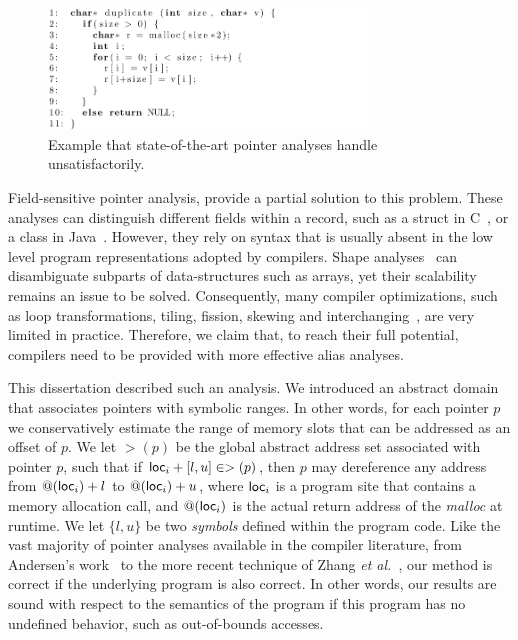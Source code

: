 \documentclass[12pt]{article}
\newcommand\loc[1]{\mbox{\textsf{loc}$_{#1}$}}
\begin{document}
\begin{figure}[th]
  \centering
\includegraphics[width=320px]{img/introex}
  \caption{Example that state-of-the-art pointer analyses handle 
  unsatisfactorily.}
  \label{fig:intro_ex}
\end{figure}

Field-sensitive pointer analysis, provide a partial solution to this problem.
These analyses can distinguish different fields within a record, such
as a struct in C~\cite{Pearce04}, or a class in Java~\cite{Yan11}.
However, they rely on syntax that is usually absent in the low level program
representations adopted by compilers.
Shape analyses~\cite{Jones82,Sagiv98} can disambiguate subparts of
data-structures such as arrays, yet their scalability remains an issue to be
solved.
Consequently, many compiler optimizations, such as
loop transformations, tiling, fission, skewing and
interchanging~\cite[Ch.09]{Wolfe96}, are very limited in practice.
Therefore, we claim that, to reach their full potential, compilers need to
be provided with more effective alias analyses.

This dissertation described such an analysis.
We introduced an abstract domain that associates pointers with symbolic ranges.
In other words, for each pointer $p$ we conservatively estimate the range of
memory slots that can be addressed as an offset of $p$.
We let $>(p)$ be the global abstract address set associated with pointer $p$, 
such that if
$\loc{i} + [l, u] \in >(p)$, then $p$ may dereference any address
from $@(\loc{i}) + l$ to $@(\loc{i}) + u$,
where $\loc{i}$ is a program site that
contains a memory allocation call, and $@(\loc{i})$ is the actual return
address of the {\em malloc} at runtime.
We let $\{ l, u \}$ be two {\em symbols} defined within the program code.
Like the vast majority of pointer analyses available in the compiler
literature, from Andersen's work~\cite{Andersen94} to the more recent 
technique of Zhang {\em et al.}~\cite{Zhang14}, our method is correct if the
underlying program is also correct.
In other words, our results are sound with respect to the semantics of the
program if this program has no undefined behavior, such as out-of-bounds
accesses.
\end{document}
